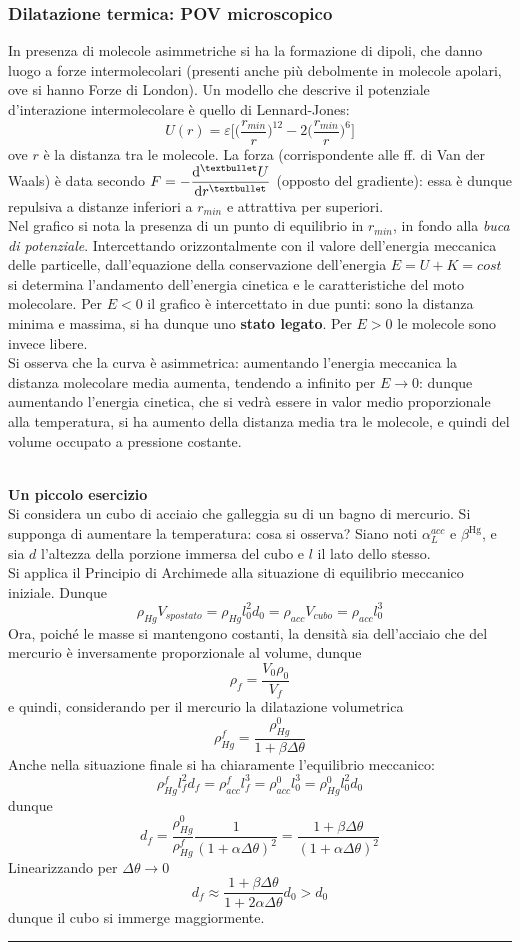 \documentclass[10pt, oneside]{book}
\newcommand{\infobox}[2]{\vspace{0.5cm}~\\ \textbf{#1} \hrulefill \vspace{0.2cm}\\#2 {}\,\\\hrule \vspace{0.5cm}}
\newcommand{\ds}{\displaystyle}
\begin{document}
\subsubsection*{Dilatazione termica: POV microscopico}
In presenza di molecole asimmetriche si ha la formazione di dipoli, che danno luogo a forze intermolecolari (presenti anche più debolmente in molecole apolari, ove si hanno Forze di London). Un modello che descrive il potenziale d'interazione intermolecolare è quello di Lennard-Jones:
\[U(r) = \varepsilon \bigg[\bigg(\frac{r_{min}}{r}\bigg)^{12} - 2 \bigg(\frac{r_{min}}{r}\bigg)^6\bigg]\]
ove $r$ è la distanza tra le molecole. La forza (corrispondente alle ff. di Van der Waals) è data secondo $\displaystyle F = - \dv[•]{U}{r}$ (opposto del gradiente): essa è dunque repulsiva a distanze inferiori a $r_{min}$ e attrattiva per superiori.
\\Nel grafico si nota la presenza di un punto di equilibrio in $r_{min}$, in fondo alla \textit{buca di potenziale}. Intercettando orizzontalmente con il valore dell'energia meccanica delle particelle, dall'equazione della conservazione dell'energia $E = U + K = cost$ si determina l'andamento dell'energia cinetica e le caratteristiche del moto molecolare. Per $E < 0$ il grafico è intercettato in due punti: sono la distanza minima e massima, si ha dunque uno \textbf{stato legato}. Per $E > 0$ le molecole sono invece libere.
\\Si osserva che la curva è asimmetrica: aumentando l'energia meccanica la distanza molecolare media aumenta, tendendo a infinito per $E \rightarrow 0$: dunque aumentando l'energia cinetica, che si vedrà essere in valor medio proporzionale alla temperatura, si ha aumento della distanza media tra le molecole, e quindi del volume occupato a pressione costante.

\infobox{Un piccolo esercizio}{
Si considera un cubo di acciaio che galleggia su di un bagno di mercurio. Si supponga di aumentare la temperatura: cosa si osserva?
Siano noti $\ds \alpha_L^{acc}$ e $\ds \beta^{\mathrm{Hg}}$, e sia $d$ l'altezza della porzione immersa del cubo e $l$ il lato dello stesso.\\
Si applica il Principio di Archimede alla situazione di equilibrio meccanico iniziale. Dunque
\[\rho_{Hg} V_{spostato} = \rho_{Hg}l_0^2 d_0 = \rho_{acc} V_{cubo} = \rho_{acc} l_0^3\]
Ora, poiché le masse si mantengono costanti, la densità sia dell'acciaio che del mercurio è inversamente proporzionale al volume, dunque
\[\rho_f = \frac{V_0 \rho_0}{V_f}\]
e quindi, considerando per il mercurio la dilatazione volumetrica
\[\rho_{Hg}^f = \frac{\rho_{Hg}^0}{1 + \beta \Delta \theta}\]
Anche nella situazione finale si ha chiaramente l'equilibrio meccanico:
\[\rho_{Hg}^f l_f^2 d_f = \rho_{acc}^f l_f^3 = \rho_{acc}^0 l_0^3 = \rho_{Hg}^0 l_0^2 d_0\]
dunque
\[d_f = \frac{\rho_{Hg}^0}{\rho_{Hg}^f} \frac{1}{(1 + \alpha \Delta \theta)^2} = \frac{1 + \beta \Delta \theta}{(1 + \alpha \Delta \theta)^2}\]
Linearizzando per $\Delta \theta \rightarrow 0$
\[d_f \approx \frac{1 + \beta \Delta \theta}{1 + 2 \alpha \Delta \theta} d_0 > d_0\]
dunque il cubo si immerge maggiormente.
}
\end{document}
